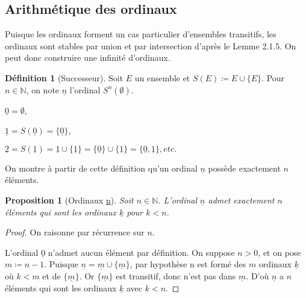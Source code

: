 \documentclass{article}
\theoremstyle{definition}
\newtheorem{definition}[subsubsection]{Définition}
\theoremstyle{plain}
\newtheorem{proposition}[subsubsection]{Proposition}
\theoremstyle{plain}
\theoremstyle{plain}
\theoremstyle{plain}
\begin{document}
\subsection{Arithmétique des ordinaux}

\par Puisque les ordinaux forment un cas particulier d'ensembles transitifs, les ordinaux sont stables par union et par intersection d'après le Lemme 2.1.5. On peut donc construire une infinité d'ordinaux.

\begin{definition}[Successeur]
	Soit \( E \) un ensemble et \( S(E) \coloneqq E \cup \{E\} \). Pour \( n \in \mathbb{N} \), on note \( \underline{n} \) l'ordinal \( S^{n}(\emptyset) \).
\end{definition}

\begin{description}
	\item \( \underline{0} = \emptyset \),
	\item \( \underline{1} = S(\underline{0}) = \{\underline{0}\} \),
	\item \( \underline{2} = S(\underline{1}) = \underline{1} \cup  \{\underline{1}\} = \{\underline{0}\} \cup \{\underline{1}\} = \{\underline{0}, \underline{1}\},  etc.\)
\end{description}

On montre à partir de cette définition qu'un ordinal \( \underline{n} \) possède exactement \( n \) éléments.
\begin{proposition}[Ordinaux \underline{n}]
	Soit \( n \in \mathbb{N} \). L'ordinal \( \underline{n} \) admet exactement \( n \) éléments qui sont les ordinaux \( \underline{k} \) pour \( k < n \).
\end{proposition}
\begin{proof}
	On raisonne par récurrence sur \( n \). 
	
	L'ordinal \( \underline{0} \) n'admet aucun élément par définition.
	On suppose \( n > 0 \), et on pose \( m \coloneqq n - 1 \). Puisque \( \underline{n} = \underline{m} \cup \{\underline{m}\} \), par hypothèse n est formé des \( m \) ordinaux \( \underline{k} \) où \( k < m \) et de \( \{\underline{m}\} \). Or \( \{\underline{m}\} \) est transitif, donc n'est pas dans \( \underline{m} \). D'où \( \underline{n} \) a \( n \) éléments qui sont les ordinaux \( \underline{k} \) avec \( k < n \).
\end{proof}
\end{document}
